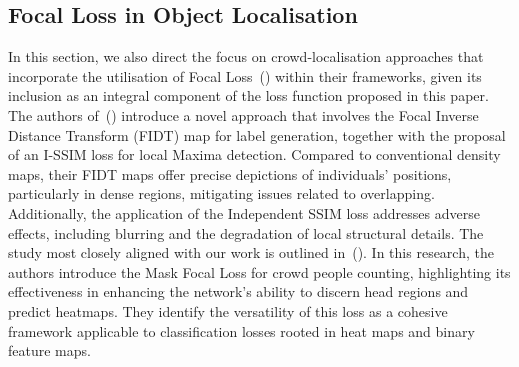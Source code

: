 \subsection{Focal Loss in Object Localisation}
In this section, we also direct the focus on crowd-localisation approaches that incorporate the utilisation of Focal Loss~(\cite{lin2017focal}) within their frameworks, given its inclusion as an integral component of the loss function proposed in this paper. The authors of~(\cite{liang2022focal}) introduce a novel approach that involves the Focal Inverse Distance Transform (FIDT) map for label generation, together with the proposal of an I-SSIM loss for local Maxima detection. Compared to conventional density maps, their FIDT maps offer precise depictions of individuals' positions, particularly in dense regions, mitigating issues related to overlapping. Additionally, the application of the Independent SSIM loss addresses adverse effects, including blurring and the degradation of local structural details. The study most closely aligned with our work is outlined in~(\cite{zhong2022mask}). In this research, the authors introduce the Mask Focal Loss for crowd people counting, highlighting its effectiveness in enhancing the network's ability to discern head regions and predict heatmaps. They identify the versatility of this loss as a cohesive framework applicable to classification losses rooted in heat maps and binary feature maps.